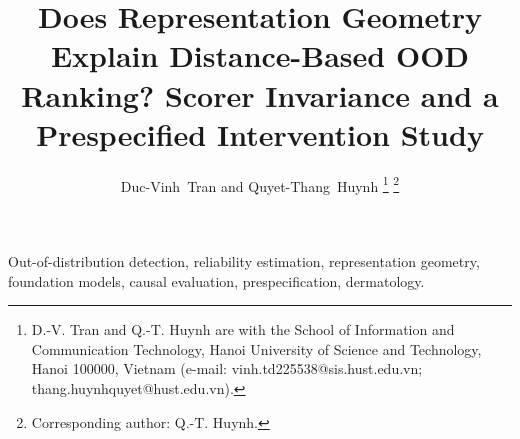 %
%
%

\title{Does Representation Geometry Explain Distance-Based OOD Ranking?
Scorer Invariance and a Prespecified Intervention Study}

\author{Duc-Vinh~Tran and Quyet-Thang~Huynh%
\thanks{D.-V. Tran and Q.-T. Huynh are with the School of Information and
Communication Technology, Hanoi University of Science and Technology, Hanoi
100000, Vietnam (e-mail: vinh.td225538@sis.hust.edu.vn;
thang.huynhquyet@hust.edu.vn).}%
\thanks{Corresponding author: Q.-T. Huynh.}}

\maketitle

\begin{abstract}

\end{abstract}

\begin{IEEEkeywords}
Out-of-distribution detection, reliability estimation, representation
geometry, foundation models, causal evaluation, prespecification, dermatology.
\end{IEEEkeywords}

